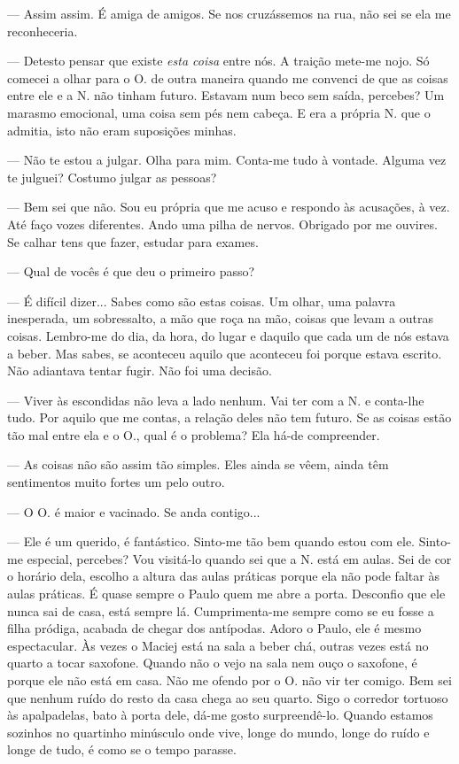 --- Assim assim. É amiga de amigos. Se nos cruzássemos na rua, não sei se
  ela me reconheceria.

--- Detesto pensar que existe \emph{esta coisa }entre nós. A traição
  mete-me nojo. Só comecei a olhar para o O. de outra maneira quando me
  convenci de que as coisas entre ele e a N. não tinham futuro. Estavam
  num beco sem saída, percebes? Um marasmo emocional, uma coisa sem pés
  nem cabeça. E era a própria N. que o admitia, isto não eram suposições
  minhas.

--- Não te estou a julgar. Olha para mim. Conta-me tudo à vontade. Alguma
  vez te julguei? Costumo julgar as pessoas?

--- Bem sei que não. Sou eu própria que me acuso e respondo às
  acusações, à vez. Até faço vozes diferentes. Ando uma pilha de nervos.
  Obrigado por me ouvires. Se calhar tens
que fazer, estudar para exames.

--- Qual de vocês é que deu o primeiro passo?

--- É difícil dizer... Sabes como são estas coisas. Um olhar, uma palavra
  inesperada, um sobressalto, a mão que roça na mão, coisas que levam a
  outras coisas. Lembro-me do dia, da hora, do lugar e daquilo que cada
  um de nós estava a beber. Mas sabes, se aconteceu aquilo que aconteceu
  foi porque estava escrito. Não adiantava tentar fugir. Não foi uma
  decisão.

--- Viver às escondidas não leva a lado nenhum. Vai ter com a N. e
  conta-lhe tudo. Por aquilo que me contas, a relação deles não tem
  futuro. Se as coisas estão tão mal entre ela e o O., qual é o
  problema? Ela há-de compreender.

--- As coisas não são assim tão simples. Eles ainda se vêem, ainda têm
  sentimentos muito fortes um pelo outro.

--- O O. é maior e vacinado. Se anda contigo...

--- Ele é um querido, é fantástico. Sinto-me tão bem quando estou com ele.
  Sinto-me especial, percebes? Vou visitá-lo quando sei que a N. está
  em aulas. Sei de cor o horário dela, escolho a altura das aulas
  práticas porque ela não pode faltar às aulas práticas. É quase sempre
  o Paulo quem me abre a porta. Desconfio que ele nunca sai de casa,
  está sempre lá. Cumprimenta-me sempre como se eu fosse a filha
  pródiga, acabada de chegar dos antípodas. Adoro o Paulo, ele é mesmo
  espectacular. Às vezes o Maciej está na sala a beber chá, outras vezes
  está no quarto a tocar saxofone. Quando não o vejo na sala nem ouço o
  saxofone, é porque ele não está em casa. Não me ofendo por o O. não
  vir ter comigo. Bem sei que nenhum ruído do resto da casa chega ao seu
  quarto. Sigo o corredor tortuoso às apalpadelas, bato à porta dele,
  dá-me gosto surpreendê-lo. Quando estamos sozinhos no quartinho
  minúsculo onde vive, longe do mundo, longe
do ruído e longe de tudo, é como se o tempo parasse.

